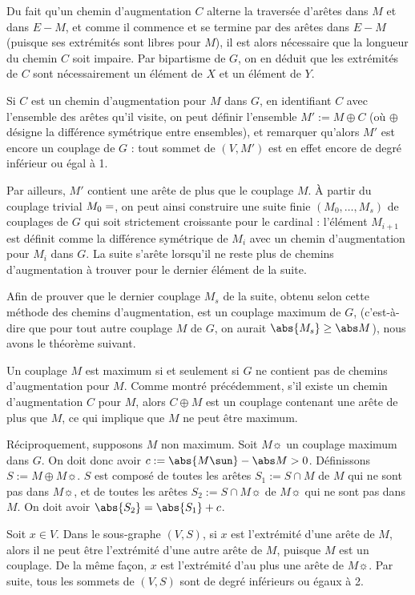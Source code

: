  Du fait qu'un chemin d'augmentation $C$ alterne la traversée d'arêtes dans $M$ et dans $E\minus M$, et comme il commence et se termine par des arêtes dans $E\minus M$ (puisque ses extrémités sont libres pour $M$), il est alors nécessaire que la longueur du chemin $C$ soit impaire. Par bipartisme de $G$, on en déduit que les extrémités de $C$ sont nécessairement un élément de $X$ et un élément de $Y$.
 
 Si $C$ est un chemin d'augmentation pour $M$ dans $G$, en identifiant $C$ avec l'ensemble des arêtes qu'il visite, on peut définir l'ensemble $M' := M \oplus C$ (où $\oplus$ désigne la différence symétrique entre ensembles), et remarquer qu'alors $M'$ est encore un couplage de $G$ : tout sommet de $(V, M')$ est en effet encore de degré inférieur ou égal à 1.
 
 Par ailleurs, $M'$ contient une arête de plus que le couplage $M$. À partir du couplage trivial $M_0 = \empty$, on peut ainsi construire une suite finie $(M_0,\dots,M_s)$ de couplages de $G$ qui soit strictement croissante pour le cardinal : l'élément $M_{i+1}$ est définit comme la différence symétrique de $M_i$ avec un chemin d'augmentation pour $M_i$ dans $G$. La suite s'arête lorsqu'il ne reste plus de chemins d'augmentation à trouver pour le dernier élément de la suite.
 
 Afin de prouver que le dernier couplage $M_s$ de la suite, obtenu selon cette méthode des chemins d'augmentation, est un couplage maximum de $G$, (c'est-à-dire que pour tout autre couplage $M$ de $G$, on aurait $\abs{M_s} \geq \abs M$), nous avons le théorème suivant.
 
 \SEP{}
    Un couplage $M$ est maximum si et seulement si $G$ ne contient pas de chemins d'augmentation pour $M$.
 \SEP\jpreuve
    Comme montré précédemment, s'il existe un chemin d'augmentation $C$ pour $M$, alors $C \oplus M$ est un couplage contenant une arête de plus que $M$, ce qui implique que $M$ ne peut être maximum.
    
    Réciproquement, supposons $M$ non maximum. Soit $M\sun$ un couplage maximum dans $G$. On doit donc avoir $c := \abs {M\sun} - \abs M > 0$. Définissons $S := M \oplus M\sun$. $S$ est composé de toutes les arêtes $S_1 := S \cap M$ de $M$ qui ne sont pas dans $M\sun$, et de toutes les arêtes $S_2 := S \cap M\sun$ de $M\sun$ qui ne sont pas dans $M$. On doit avoir $\abs{S_2} = \abs{S_1}+c$.
    
    Soit $x \in V$. Dans le sous-graphe $(V, S)$, si $x$ est l'extrémité d'une arête de $M$, alors il ne peut être l'extrémité d'une autre arête de $M$, puisque $M$ est un couplage. De la même façon, $x$ est l'extrémité d'au plus une arête de $M\sun$. Par suite, tous les sommets de $(V,S)$ sont de degré inférieurs ou égaux à 2.
    
